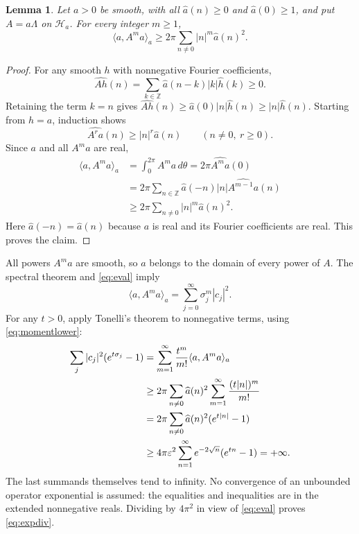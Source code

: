 \documentclass[11pt]{article}
\newtheorem{lemma}[theorem]{Lemma}
\theoremstyle{remark}
\newcommand{\Hh}{\mathcal H}
\newcommand{\eps}{\varepsilon}
\newcommand{\ip}[2]{\langle #1,#2\rangle_a}
\newcommand{\an}{\widehat a}
\begin{document}
\begin{lemma}\label{lem:positive}
Let $a>0$ be smooth, with all $\an(n)\geq0$ and $\an(0)\geq1$, and put $A=a\Lambda$ on $\Hh_a$. For every integer $m\geq1$,
\begin{equation}\label{eq:momentlower}
 \ip{a}{A^m a}\geq
 2\pi\sum_{n\ne0}|n|^m\an(n)^2.
\end{equation}
\end{lemma}
\begin{proof}
For any smooth $h$ with nonnegative Fourier coefficients,
\[
 \widehat{Ah}(n)=\sum_{k\in\mathbb Z}\an(n-k)|k|\widehat h(k)\geq0.
\]
Retaining the term $k=n$ gives
$\widehat{Ah}(n)\geq\an(0)|n|\widehat h(n)\geq|n|\widehat h(n)$.
Starting from $h=a$, induction shows
\begin{equation}\label{eq:powerlower}
 \widehat{A^r a}(n)\geq |n|^r\an(n)
 \qquad(n\ne0,\ r\geq0).
\end{equation}
Since $a$ and all $A^m a$ are real,
\begin{align*}
 \ip{a}{A^m a}
 &=\int_0^{2\pi}A^m a\,d\theta
 =2\pi\widehat{A^m a}(0)\\
 &=2\pi\sum_{n\in\mathbb Z}\an(-n)|n|\widehat{A^{m-1}a}(n)\\
 &\geq2\pi\sum_{n\ne0}|n|^m\an(n)^2.
\end{align*}
Here $\an(-n)=\an(n)$ because $a$ is real and its Fourier coefficients are real. This proves the claim.
\end{proof}

All powers $A^m a$ are smooth, so $a$ belongs to the domain of every power of $A$. The spectral theorem and \eqref{eq:eval} imply
\begin{equation}\label{eq:spectralmoment}
 \ip{a}{A^m a}=\sum_{j=0}^\infty\sigma_j^m|c_j|^2.
\end{equation}
For any $t>0$, apply Tonelli's theorem to nonnegative terms, using \eqref{eq:momentlower}:
\begin{align}
 \sum_j|c_j|^2(e^{t\sigma_j}-1)
 &=\sum_{m=1}^\infty\frac{t^m}{m!}\ip{a}{A^m a}\notag\\
 &\geq 2\pi\sum_{n\ne0}\an(n)^2
       \sum_{m=1}^\infty\frac{(t|n|)^m}{m!}\notag\\
 &=2\pi\sum_{n\ne0}\an(n)^2(e^{t|n|}-1)\notag\\
 &\geq4\pi\eps^2\sum_{n=1}^\infty
       e^{-2\sqrt n}(e^{tn}-1)=+\infty.\label{eq:tonelli}
\end{align}
The last summands themselves tend to infinity. No convergence of an unbounded operator exponential is assumed: the equalities and inequalities are in the extended nonnegative reals. Dividing by $4\pi^2$ in view of \eqref{eq:eval} proves \eqref{eq:expdiv}.
\end{document}
